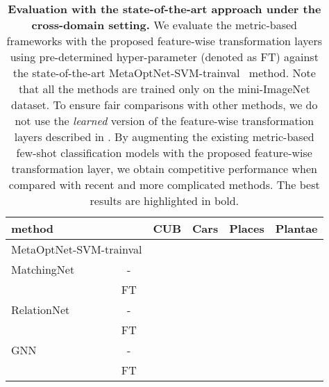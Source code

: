 \begin{table}[t]\footnotesize
	\centering
	\caption{\textbf{Evaluation with the state-of-the-art approach under the cross-domain setting.} We evaluate the metric-based frameworks with the proposed feature-wise transformation layers using pre-determined hyper-parameter  (denoted as FT) against the state-of-the-art MetaOptNet-SVM-trainval~\cite{lee2019rr} method. 
Note that all the methods are trained only on the mini-ImageNet dataset. 
To ensure fair comparisons with other methods, we do not use the \emph{learned} version of the feature-wise transformation layers described in . 
By augmenting the existing metric-based few-shot classification models with the proposed feature-wise transformation layer, we obtain competitive performance when compared with recent and more complicated methods. The best results are highlighted in bold.}
	\begin{tabular}{@{}lc cccc@{}} 
	    \toprule
	    method &  & CUB & Cars & Places & Plantae \\
	    \midrule
	    \multicolumn{2}{l}{MetaOptNet-SVM-trainval} &  &  &  & \\
	    \midrule
	    MatchingNet & - &  &  &  &  \\
		& FT &  &  &  &  \\
		RelationNet & - &  &  &  &  \\
	    & FT &  &  &  &  \\
		GNN & - &  &  &  &  \\
		& FT &  &  &  &  \\
		\bottomrule 
	\end{tabular}
	\label{tab:sotacross}
\end{table}
